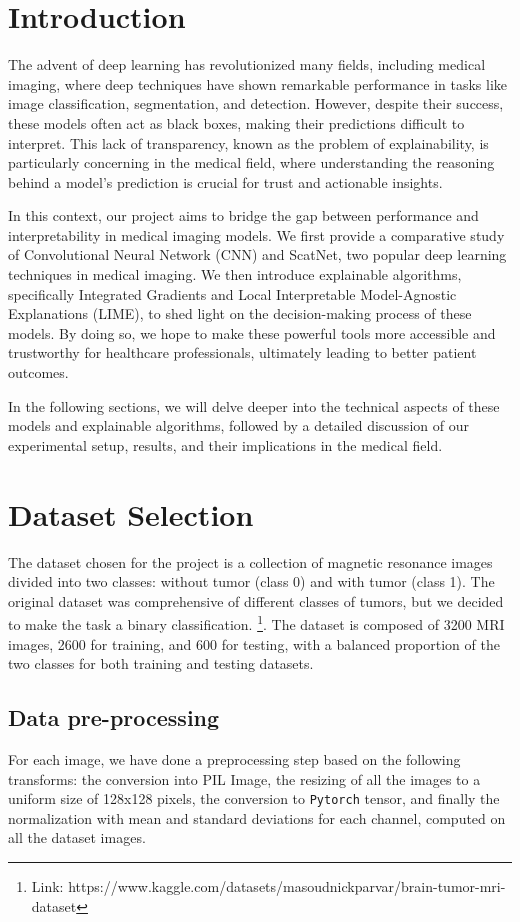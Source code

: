 \documentclass[11pt]{article}
\begin{document}
\begin{multicols*}{2}

\section{Introduction}
The advent of deep learning has revolutionized many fields, including medical imaging, where deep techniques have shown remarkable performance in tasks like image classification, segmentation, and detection. However, despite their success, these models often act as black boxes, making their predictions difficult to interpret. This lack of transparency, known as the problem of explainability, is particularly concerning in the medical field, where understanding the reasoning behind a model’s prediction is crucial for trust and actionable insights.

In this context, our project aims to bridge the gap between performance and interpretability in medical imaging models. We first provide a comparative study of Convolutional Neural Network (CNN) and ScatNet, two popular deep learning techniques in medical imaging. We then introduce explainable algorithms, specifically Integrated Gradients and Local Interpretable Model-Agnostic Explanations (LIME), to shed light on the decision-making process of these models. By doing so, we hope to make these powerful tools more accessible and trustworthy for healthcare professionals, ultimately leading to better patient outcomes.

In the following sections, we will delve deeper into the technical aspects of these models and explainable algorithms, followed by a detailed discussion of our experimental setup, results, and their implications in the medical field.

\section{Dataset Selection}
The dataset chosen for the project is a collection of magnetic resonance images divided into two classes: without tumor (class 0) and with tumor (class 1). The original dataset was comprehensive of different classes of tumors, but we decided to make the task a binary classification. \footnote{Link: https://www.kaggle.com/datasets/masoudnickparvar/brain-tumor-mri-dataset}. The dataset is composed of 3200 MRI images, 2600 for training, and 600 for testing, with a balanced proportion of the two classes for both training and testing datasets.

\subsection{Data pre-processing}
For each image, we have done a preprocessing step based on the following transforms: the conversion into PIL Image, the resizing of all the images to a uniform size of 128x128 pixels, the conversion to \texttt{Pytorch} tensor, and finally the normalization with mean and standard deviations for each channel, computed on all the dataset images. 


\end{multicols*}
\end{document}
